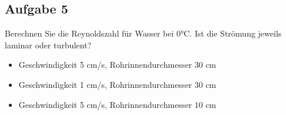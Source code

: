 \documentclass[nobib]{tufte-book}
\begin{document}
\begin{marginfigure}
\centering
{}
\caption{Ein Fass}
\end{marginfigure}
%
%
%



%
%
%
%
%
%
%
%
%
%
%




\subsection*{Aufgabe 5}
Berechnen Sie die Reynoldszahl für Wasser bei 0°C. Ist die Strömung jeweils laminar oder turbulent?
\begin{itemize}
       \item[a.] Geschwindigkeit 5 cm/s, Rohrinnendurchmesser 30 cm
       \item[b.] Geschwindigkeit 1 cm/s, Rohrinnendurchmesser 30 cm
       \item[c.] Geschwindigkeit 5 cm/s, Rohrinnendurchmesser 10 cm
\end{itemize}
\end{document}
